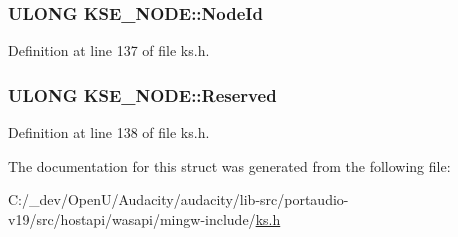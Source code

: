 \subsubsection[{\texorpdfstring{Node\+Id}{NodeId}}]{\setlength{\rightskip}{0pt plus 5cm}U\+L\+O\+NG K\+S\+E\+\_\+\+N\+O\+D\+E\+::\+Node\+Id}\hypertarget{struct_k_s_e___n_o_d_e_ac1c51c2e8b05532a521623aeea149ea0}{}\label{struct_k_s_e___n_o_d_e_ac1c51c2e8b05532a521623aeea149ea0}


Definition at line 137 of file ks.\+h.

\subsubsection[{\texorpdfstring{Reserved}{Reserved}}]{\setlength{\rightskip}{0pt plus 5cm}U\+L\+O\+NG K\+S\+E\+\_\+\+N\+O\+D\+E\+::\+Reserved}\hypertarget{struct_k_s_e___n_o_d_e_acd7c218fedb770934488ce65586aaddc}{}\label{struct_k_s_e___n_o_d_e_acd7c218fedb770934488ce65586aaddc}


Definition at line 138 of file ks.\+h.



The documentation for this struct was generated from the following file\+:\begin{DoxyCompactItemize}
\item 
C\+:/\+\_\+dev/\+Open\+U/\+Audacity/audacity/lib-\/src/portaudio-\/v19/src/hostapi/wasapi/mingw-\/include/\hyperlink{ks_8h}{ks.\+h}\end{DoxyCompactItemize}

